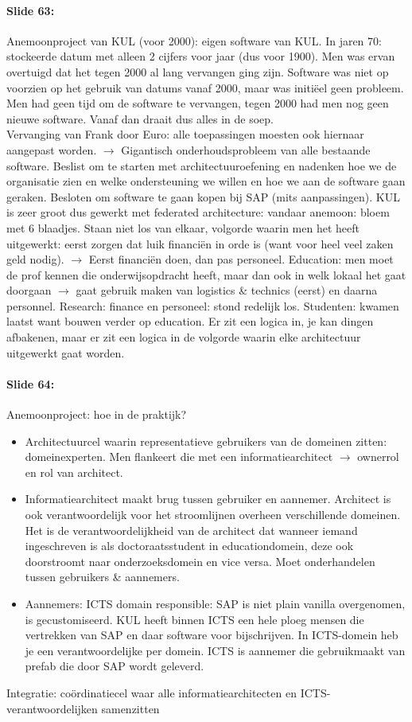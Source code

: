\documentclass[10pt,a4paper]{report}
\begin{document}
\paragraph{Slide 63:}Anemoonproject van KUL (voor 2000): eigen software van KUL. In jaren 70: stockeerde datum met alleen 2 cijfers voor jaar (dus voor 1900). Men was ervan overtuigd dat het tegen 2000 al lang vervangen ging zijn. Software was niet op voorzien op het gebruik van datums vanaf 2000, maar was initiëel geen probleem.
Men had geen tijd om de software te vervangen, tegen 2000 had men nog geen nieuwe software. Vanaf dan draait dus alles in de soep.\\ Vervanging van Frank door Euro: alle toepassingen moesten ook hiernaar aangepast worden. $\rightarrow$ Gigantisch onderhoudsprobleem van alle bestaande software. Beslist om te starten met architectuuroefening en nadenken hoe we de organisatie zien en welke ondersteuning we willen en hoe we aan de software gaan geraken. Besloten om software te gaan kopen bij SAP (mits aanpassingen). KUL is zeer groot dus gewerkt met federated architecture: vandaar anemoon: bloem met 6 blaadjes. Staan niet los van elkaar, volgorde waarin men het heeft uitgewerkt: eerst zorgen dat luik financiën in orde is (want voor heel veel zaken geld nodig). $\rightarrow$ Eerst financiën doen, dan pas personeel. Education: men moet de prof kennen die onderwijsopdracht heeft, maar dan ook in welk lokaal het gaat doorgaan $\rightarrow$ gaat gebruik maken van logistics \& technics (eerst) en daarna personnel. Research: finance en personeel: stond redelijk los. Studenten: kwamen laatst want bouwen verder op education. Er zit een logica in, je kan dingen afbakenen, maar er zit een logica in de volgorde waarin elke architectuur uitgewerkt gaat worden.

\paragraph{Slide 64:}Anemoonproject: hoe in de praktijk?
\begin{itemize} 
\item Architectuurcel waarin representatieve gebruikers van de domeinen zitten: domeinexperten. Men flankeert die met een informatiearchitect $\rightarrow$ ownerrol en rol van architect. 
\item Informatiearchitect maakt brug tussen gebruiker en aannemer. Architect is ook verantwoordelijk voor het stroomlijnen overheen verschillende domeinen. Het is de verantwoordelijkheid van de architect dat wanneer iemand ingeschreven is als doctoraatsstudent in educationdomein, deze ook doorstroomt naar onderzoeksdomein en vice versa. Moet onderhandelen tussen gebruikers \& aannemers.
\item Aannemers: ICTS domain responsible: SAP is niet plain vanilla overgenomen, is gecustomiseerd. KUL heeft binnen ICTS een hele ploeg mensen die vertrekken van SAP en daar software voor bijschrijven. In ICTS-domein heb je een verantwoordelijke per domein. ICTS is aannemer die gebruikmaakt van prefab die door SAP wordt geleverd.
\end{itemize}
Integratie: coördinatiecel waar alle informatiearchitecten en ICTS-verantwoordelijken samenzitten
\end{document}
